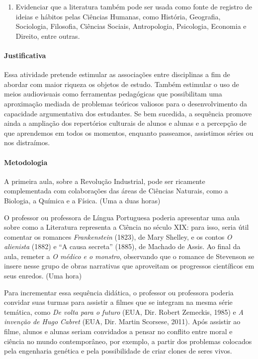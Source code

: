 \documentclass[12pt]{extarticle}
\begin{document}
{\begin{enumerate}
\item
Evidenciar que a literatura também pode ser usada como fonte de registro
de ideias e hábitos pelas Ciências Humanas, como História, Geografia,
Sociologia, Filosofia, Ciências Sociais, Antropologia, Psicologia,
Economia e Direito, entre outras.
\end{enumerate}

\paragraph{Justificativa}
Essa atividade pretende estimular as associações entre disciplinas a fim
de abordar com maior riqueza os objetos de estudo. Também estimular o
uso de meios audiovisuais como ferramentas pedagógicas que possibilitam
uma aproximação mediada de problemas teóricos valiosos para o
desenvolvimento da capacidade argumentativa dos estudantes. Se bem
sucedida, a sequência promove ainda a ampliação dos repertórios
culturais de alunos e alunas e a percepção de que aprendemos em todos os
momentos, enquanto passeamos, assistimos séries ou nos distraímos.

\paragraph{Metodologia}
A primeira aula, sobre a Revolução Industrial, pode ser ricamente complementada
com colaborações das áreas de Ciências Naturais, como a Biologia, a
Química e a Física. (Uma a duas horas)

O professor ou professora de Língua Portuguesa poderia apresentar uma
aula sobre como a Literatura representa a Ciência no século XIX: para
isso, seria útil comentar os romances \emph{Frankenstein} (1823), de
Mary Shelley, e os contos \emph{O alienista} (1882) e ``A causa
secreta'' (1885), de Machado de Assis. Ao final da aula, remeter a
\emph{O médico e o monstro}, observando que o romance de Stevenson se
insere nesse grupo de obras narrativas que aproveitam os progressos
científicos em seus enredos. (Uma hora)

Para incrementar essa sequência didática, o professor ou professora
poderia convidar suas turmas para assistir a filmes que se integram na
mesma série temática, como \emph{De volta para o futuro} (EUA, Dir.
Robert Zemeckis, 1985) e \emph{A invenção de Hugo Cabret} (EUA, Dir.
Martin Scorsese, 2011). Após assistir ao filme, alunos e alunas seriam
convidados a pensar no conflito entre moral e ciência no mundo
contemporâneo, por exemplo, a partir dos problemas colocados pela
engenharia genética e pela possibilidade de criar clones de seres vivos.

}
\end{document}
